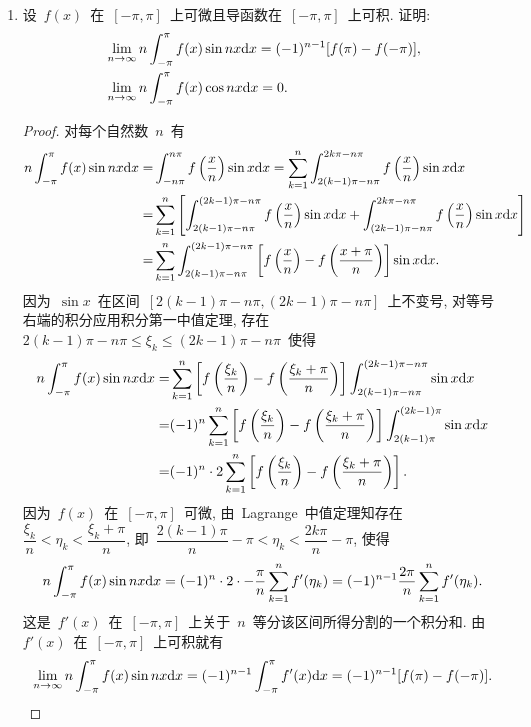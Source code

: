 \documentclass[UTF8,a4paper,20pt]{article}
\begin{document}
\begin{enumerate}
\item 设~$f(x)$~在~$[-\pi,\pi]$~上可微且导函数在~$[-\pi,\pi]$~上可积. 证明:
\begin{equation*}
	\begin{split}
	&\lim_{n\to\infty} n\int_{-\pi}^{\pi} f(x)\sin{nx}\mathrm{d}x=(-1)^{n-1}[f(\pi)-f(-\pi)],\\
	&\lim_{n\to\infty} n\int_{-\pi}^{\pi} f(x)\cos{nx}\mathrm{d}x=0.
	\end{split}
\end{equation*}
\begin{proof}
	对每个自然数~$n$~有
	\begin{equation*}
		\begin{split}
			n\int_{-\pi}^{\pi} f(x)\sin{nx}\mathrm{d}x=&\int_{-n\pi}^{n\pi}f\left(\dfrac{x}{n}\right)\sin{x}\mathrm{d}x=\sum_{k=1}^{n}\int_{2(k-1)\pi-n\pi}^{2k\pi-n\pi}f\left(\dfrac{x}{n}\right)\sin{x}\mathrm{d}x\\
			=&\sum_{k=1}^{n}\left[\int_{2(k-1)\pi-n\pi}^{(2k-1)\pi-n\pi}f\left(\dfrac{x}{n}\right)\sin{x}\mathrm{d}x+\int_{(2k-1)\pi-n\pi}^{2k\pi-n\pi}f\left(\dfrac{x}{n}\right)\sin{x}\mathrm{d}x\right]\\
			=&\sum_{k=1}^n\int_{2(k-1)\pi-n\pi}^{(2k-1)\pi-n\pi}\left[f\left(\dfrac{x}{n}\right)-f\left(\dfrac{x+\pi}{n}\right)\right]\sin{x}\mathrm{d}x.
		\end{split}
	\end{equation*}
因为~$\sin{x}$~在区间~$[2(k-1)\pi-n\pi, (2k-1)\pi-n\pi]$~上不变号, 对等号右端的积分应用积分第一中值定理, 存在~$2(k-1)\pi-n\pi\leqslant\xi_k\leqslant(2k-1)\pi-n\pi$~使得
	\begin{equation*}
		\begin{split}
			n\int_{-\pi}^{\pi} f(x)\sin{nx}\mathrm{d}x=&\sum_{k=1}^{n}\left[f\left(\dfrac{\xi_k}{n}\right)-f\left(\dfrac{\xi_k+\pi}{n}\right)\right]\int_{2(k-1)\pi-n\pi}^{(2k-1)\pi-n\pi}\sin{x}\mathrm{d}x\\
			=&(-1)^n\sum_{k=1}^{n}\left[f\left(\dfrac{\xi_k}{n}\right)-f\left(\dfrac{\xi_k+\pi}{n}\right)\right]\int_{2(k-1)\pi}^{(2k-1)\pi}\sin{x}\mathrm{d}x\\
			=&(-1)^n\cdot2\sum_{k=1}^{n}\left[f\left(\dfrac{\xi_k}{n}\right)-f\left(\dfrac{\xi_k+\pi}{n}\right)\right].
		\end{split}
	\end{equation*}
因为~$f(x)$~在~$[-\pi,\pi]$~可微, 由~Lagrange~中值定理知存在~$\dfrac{\xi_k}{n}<\eta_k<\dfrac{\xi_k+\pi}{n}$, 即~$\dfrac{2(k-1)\pi}{n}-\pi<\eta_k<\dfrac{2k\pi}{n}-\pi$, 使得
	\[n\int_{-\pi}^{\pi} f(x)\sin{nx}\mathrm{d}x=(-1)^n\cdot2\cdot-\dfrac{\pi}{n}\sum_{k=1}^nf'(\eta_k)=(-1)^{n-1}\dfrac{2\pi}{n}\sum_{k=1}^nf'(\eta_k).\]
这是~$f'(x)$~在~$[-\pi,\pi]$~上关于~$n$~等分该区间所得分割的一个积分和. 由~$f'(x)$~在~$[-\pi,\pi]$~上可积就有
	\[\lim_{n\to\infty}n\int_{-\pi}^{\pi} f(x)\sin{nx}\mathrm{d}x=(-1)^{n-1}\int_{-\pi}^{\pi}f'(x)\mathrm{d}x=(-1)^{n-1}[f(\pi)-f(-\pi)].\]


\end{proof}
\end{enumerate}
\end{document}
